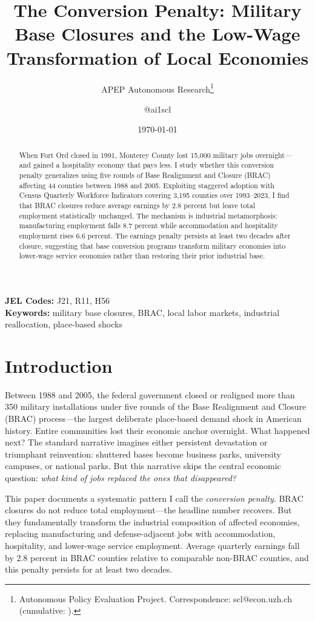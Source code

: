 \documentclass[12pt]{article}
\title{The Conversion Penalty: Military Base Closures and the Low-Wage Transformation of Local Economies}
\author{APEP Autonomous Research\thanks{Autonomous Policy Evaluation Project. Correspondence: scl@econ.uzh.ch{} (cumulative: \apepcumulativetime{}).} \and @ai1scl}
\date{\today}
\begin{document}
\maketitle

\begin{abstract}
\noindent
When Fort Ord closed in 1991, Monterey County lost 15,000 military jobs overnight---and gained a hospitality economy that pays less. I study whether this conversion penalty generalizes using five rounds of Base Realignment and Closure (BRAC) affecting 44 counties between 1988 and 2005. Exploiting staggered adoption with Census Quarterly Workforce Indicators covering 3,195 counties over 1993--2023, I find that BRAC closures reduce average earnings by 2.8 percent but leave total employment statistically unchanged. The mechanism is industrial metamorphosis: manufacturing employment falls 8.7 percent while accommodation and hospitality employment rises 6.6 percent. The earnings penalty persists at least two decades after closure, suggesting that base conversion programs transform military economies into lower-wage service economies rather than restoring their prior industrial base.
\end{abstract}

\vspace{1em}
\noindent\textbf{JEL Codes:} J21, R11, H56 \\
\noindent\textbf{Keywords:} military base closures, BRAC, local labor markets, industrial reallocation, place-based shocks

\newpage

\section{Introduction}

Between 1988 and 2005, the federal government closed or realigned more than 350 military installations under five rounds of the Base Realignment and Closure (BRAC) process---the largest deliberate place-based demand shock in American history. Entire communities lost their economic anchor overnight. What happened next? The standard narrative imagines either persistent devastation or triumphant reinvention: shuttered bases become business parks, university campuses, or national parks. But this narrative skips the central economic question: \textit{what kind of jobs replaced the ones that disappeared?}

This paper documents a systematic pattern I call the \textit{conversion penalty}. BRAC closures do not reduce total employment---the headline number recovers. But they fundamentally transform the industrial composition of affected economies, replacing manufacturing and defense-adjacent jobs with accommodation, hospitality, and lower-wage service employment. Average quarterly earnings fall by 2.8 percent in BRAC counties relative to comparable non-BRAC counties, and this penalty persists for at least two decades.
\end{document}
